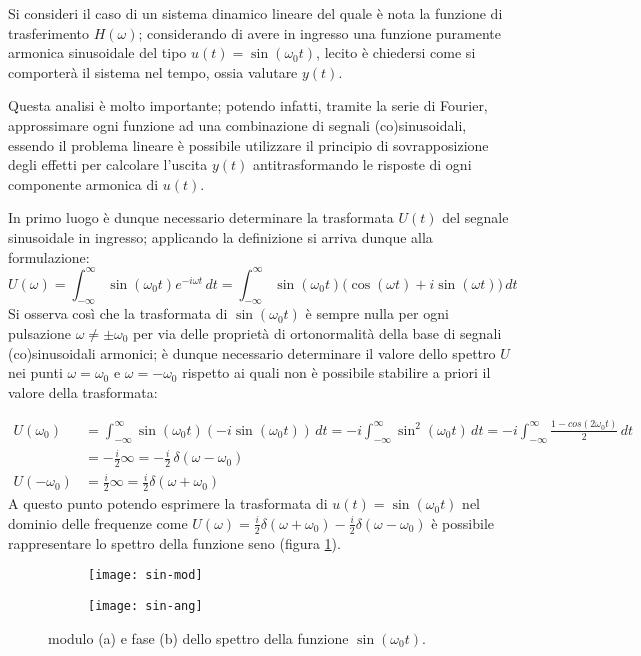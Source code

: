 		Si consideri il caso di un sistema dinamico lineare del quale è nota la funzione di trasferimento $H(\omega)$; considerando di avere in ingresso una funzione puramente armonica sinusoidale del tipo $u(t) = \sin(\omega_0 t)$, lecito è chiedersi come si comporterà il sistema nel tempo, ossia valutare $y(t)$.
		\begin{nota}
			Questa analisi è molto importante; potendo infatti, tramite la serie di Fourier, approssimare ogni funzione ad una combinazione di segnali (co)sinusoidali, essendo il problema lineare è possibile utilizzare il principio di sovrapposizione degli effetti per calcolare l'uscita $y(t)$ antitrasformando le risposte di ogni componente armonica di $u(t)$.
		\end{nota}
		
		In primo luogo è dunque necessario determinare la trasformata $U(t)$ del segnale sinusoidale in ingresso; applicando la definizione si arriva dunque alla formulazione:
		\[U(\omega) = \int_{-\infty}^\infty \sin(\omega_0 t) e^{-i\omega t}\, dt = \int_{-\infty}^\infty \sin(\omega_0t) \Big(\cos(\omega t) + i\sin(\omega t)\Big) \, dt\]	
		Si osserva così che la trasformata di $\sin(\omega_0 t)$ è sempre nulla per ogni pulsazione $\omega \neq \pm \omega_0$ per via delle proprietà di ortonormalità della base di segnali (co)sinusoidali armonici; è dunque necessario determinare il valore dello spettro $U$ nei punti $\omega= \omega_0$ e $\omega = - \omega_0$ rispetto ai quali non è possibile stabilire a priori il valore della trasformata:
		
		\begin{align*}
			U(\omega_0) & = \int_{-\infty}^\infty\sin(\omega_0 t) (-i\sin(\omega_0 t)) \, dt = - i\int_{-\infty}^\infty \sin^2(\omega_0t) \, dt = - i\int_{-\infty}^\infty \frac {1-cos(2\omega_0 t)}2 \, dt \\
			& = - \frac i 2 \infty = -\frac  i 2 \, \delta(\omega - \omega_0)\\
			U(-\omega_0) & = \frac i 2 \infty = \frac i 2 \delta(\omega+\omega_0)
		\end{align*}
		A questo punto potendo esprimere la trasformata di  $u(t) = \sin(\omega_0t)$ nel dominio delle frequenze come $U(\omega) = \frac i 2 \delta(\omega + \omega_0) - \frac i 2 \delta(\omega-\omega_0)$ è possibile rappresentare lo spettro della funzione seno (figura \ref{fig:four:spettroseno}).
		\begin{figure}[bht]
			\centering
			\begin{subfigure}{0.48\linewidth}
				\centering
				\texttt{[image: sin-mod]} \caption{}
			\end{subfigure}
			\begin{subfigure}{0.48\linewidth}
				\centering
				\texttt{[image: sin-ang]} \caption{}
			\end{subfigure}
			\caption{modulo (a) e fase (b) dello spettro della funzione $\sin(\omega_0 t)$.}
			\label{fig:four:spettroseno}
		\end{figure}
		
